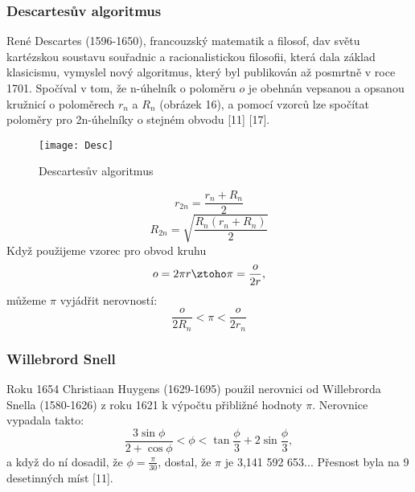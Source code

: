 \documentclass[soc]{gzwroc} %
\begin{document}
\subsubsection{Descartesův algoritmus}
René Descartes (1596-1650), francouzský matematik a filosof, dav světu kartézskou soustavu souřadnic a racionalistickou filosofii, která dala základ klasicismu, vymyslel nový algoritmus, který byl publikován až posmrtně v roce 1701. Spočíval v tom, že n-úhelník o poloměru $o$ je obehnán vepsanou a opsanou kružnicí o poloměrech $r_n$ a $R_n$ (obrázek 16), a pomocí vzorců lze spočítat poloměry pro 2n-úhelníky o stejném obvodu [11] [17].
\begin{figure}[!ht]
\texttt{[image: Desc]}
\caption{Descartesův algoritmus}
\label{fig:kruh}
\end{figure}
\begin{equation}
r_{2n}=\frac{r_n+R_n}{2}
\end{equation}
\begin{equation}
R_{2n}=\sqrt{\frac{R_n(r_n+R_n)}{2}}
\end{equation}
Když použijeme vzorec pro obvod kruhu
$$
o=2\pi r \ztoho \pi=\frac{o}{2r},
$$
můžeme $\pi$ vyjádřit nerovností:
\begin{equation}
\frac{o}{2R_n}<\pi<\frac{o}{2r_n}
\end{equation}

\subsubsection{Willebrord Snell}
Roku 1654 Christiaan Huygens (1629-1695) použil nerovnici od Willebrorda Snella (1580-1626) z roku 1621 k výpočtu přibližné hodnoty $\pi$. Nerovnice vypadala takto:
\begin{equation}
\frac{3\sin\phi}{2+\cos\phi}<\phi<\tan\frac{\phi}{3}+2\sin\frac{\phi}{3},
\end{equation}
a když do ní dosadil, že $\phi  = \frac{\pi}{30}$, dostal, že $\pi$ je 3,141 592 653... Přesnost byla na 9 desetinných míst [11].
\end{document}
